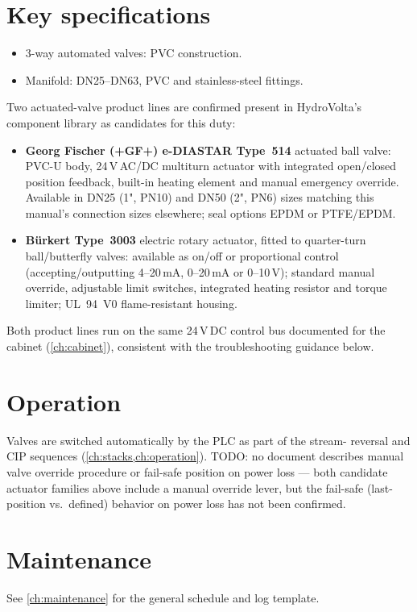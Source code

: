 \documentclass[a4paper,11pt,twoside,openright,numbers=noenddot]{scrreprt}
\begin{document}
\section{Key specifications}
\begin{itemize}
\item 3-way automated valves: PVC construction.
\item Manifold: DN25--DN63, PVC and stainless-steel fittings.
\end{itemize}
Two actuated-valve product lines are confirmed present in HydroVolta's
component library as candidates for this duty:
\begin{itemize}
\item \textbf{Georg Fischer (+GF+) e-DIASTAR Type~514} actuated ball
  valve: PVC-U body, 24\,V\,AC/DC multiturn actuator with integrated
  open/closed position feedback, built-in heating element and manual
  emergency override. Available in DN25 (1", PN10) and DN50 (2", PN6)
  sizes matching this manual's connection sizes elsewhere; seal options
  EPDM or PTFE/EPDM.
\item \textbf{B\"urkert Type~3003} electric rotary actuator, fitted to
  quarter-turn ball/butterfly valves: available as on/off or proportional
  control (accepting/outputting 4--20\,mA, 0--20\,mA or 0--10\,V);
  standard manual override, adjustable limit switches, integrated heating
  resistor and torque limiter; UL~94~V0 flame-resistant housing.
\end{itemize}
Both product lines run on the same 24\,V\,DC control bus documented for
the cabinet (\cref{ch:cabinet}), consistent with the troubleshooting
guidance below.

\section{Operation}
Valves are switched automatically by the PLC as part of the stream-
reversal and CIP sequences (\cref{ch:stacks,ch:operation}). TODO: no
document describes manual valve override procedure or fail-safe position
on power loss --- both candidate actuator families above include a manual
override lever, but the fail-safe (last-position vs.\ defined) behavior on
power loss has not been confirmed.

\section{Maintenance}
See \cref{ch:maintenance} for the general schedule and log template.
\end{document}
